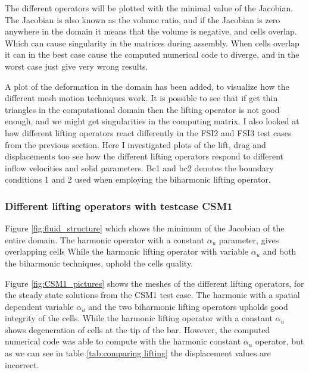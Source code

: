 The different operators will be plotted with the minimal value of the Jacobian. The Jacobian is also known as the volume ratio, and if the Jacobian is zero anywhere in the domain it means that the volume is negative, and cells overlap. Which can cause singularity in the matrices during assembly. When cells overlap it can in the best case cause the computed numerical code to diverge, and in the worst case just give very wrong results. \newline

A plot of the deformation in the domain has been added, to visualize how the different mesh motion techniques work. It is possible to see that if get thin triangles in the computational domain then the lifting operator is not good enough, and we might get singularities in the computing matrix.
I also looked at how different lifting operators react differently in the FSI2 and FSI3 test cases from the previous section. Here I investigated plots of the lift, drag and displacements too see how the different lifting operators respond to different inflow velocities and solid parameters. Bc1 and bc2 denotes the boundary conditions 1 and 2 used when employing the biharmonic lifting operator.


\subsubsection*{Different lifting operators with testcase CSM1}

Figure \ref{fig:fluid_structure} which shows the minimum of the Jacobian of the entire domain. The harmonic operator with a constant $\alpha_u$ parameter, gives overlapping cells
While the harmonic lifting operator with variable $\alpha_u$ and both the biharmonic techniques, uphold the cells quality.

Figure \ref{fig:CSM1_pictures} shows the meshes of the different lifting operators, for the steady state solutions from the CSM1 test case. The harmonic with a spatial dependent variable $\alpha_u$ and the two biharmonic lifting operators upholds good integrity of the cells. While the harmonic lifting operator with a constant $\alpha_u$ shows degeneration of cells at the tip of the bar. However, the computed numerical code was able to compute with the harmonic constant $\alpha_u$ operator, but as we can see in table \ref{tab:comparing lifting} the displacement values are incorrect.

